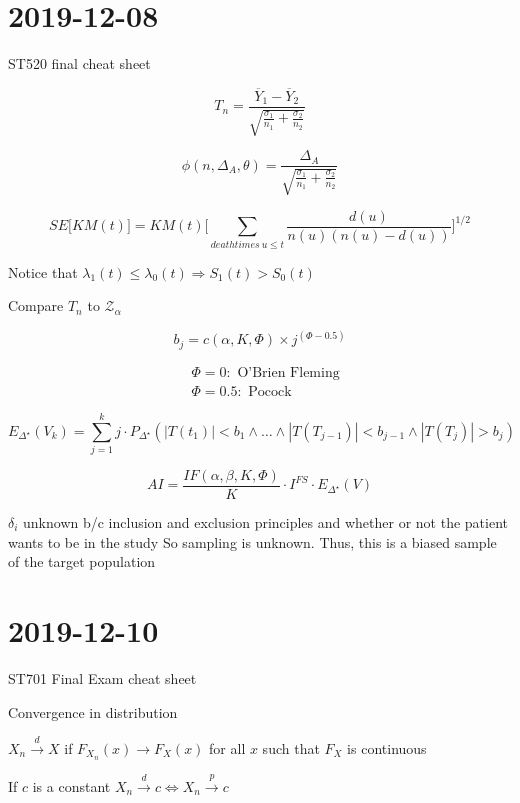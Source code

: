 \documentclass[]{article}
\begin{document}
\section*{2019-12-08}
ST520 final cheat sheet


$$
T_n = \frac{ \overline{ Y }_1  - \overline{ Y }_2  }{ \sqrt{ \frac{ \sigma_1 }{ n_1 }   + \frac{ \sigma_2 }{ n_2 }  } }
$$

$$
\phi(n, \Delta_A, \theta) = \frac{ \Delta_A}{ \sqrt{ \frac{ \sigma_1 }{ n_1 }   + \frac{ \sigma_2 }{ n_2 }  } }
$$



$$
SE\Big[ KM(t) \Big] = KM(t) \Bigg[ \sum_{ death times \ u \leq t} \dfrac{ d(u) }{ n(u)(n(u) - d(u)) }  \Bigg]^{1/2}
$$

Notice that $\lambda_1(t) \leq \lambda_0(t) \Rightarrow S_1(t) > S_0(t)$


Compare $T_n$ to $\mathcal{Z}_{\alpha}$



$$
b_j = c(\alpha, K, \Phi) \times j^{(\Phi - 0.5)}
$$



\begin{align*}
& \Phi = 0  : \text{ O'Brien Fleming} \\
 & \Phi = 0.5 :  \text{ Pocock}
\end{align*}


$$
E_{\Delta^\star}(V_k) = \sum_{j=1}^k j \cdot P_{\Delta^\star}( |T(t_1) | < b_1 \land \dots \land |T(T_{j-1}) | < b_{j-1} \land |T(T_j) | > b_j)
$$

$$
AI = \frac{ IF(\alpha, \beta, K, \Phi) }{ K } \cdot I^{FS} \cdot E_{\Delta^
\star}(V)
$$

\noindent
$\delta_i$ unknown b/c inclusion and exclusion principles and whether or not the patient wants to be in the study So sampling is unknown. Thus, this is a biased sample of the target population


\section*{2019-12-10}
ST701 Final Exam cheat sheet

Convergence in distribution

$X_n \stackrel{d}{\rightarrow} X$ if $F_{X_n}(x) \rightarrow F_X(x)$ for all $x$ such that $F_X$ is continuous

If $c$ is a constant $ X_n \stackrel{d}{\rightarrow} c \Leftrightarrow X_n \stackrel{p}{\rightarrow} c $
\end{document}
